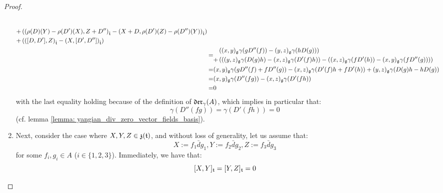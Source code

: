 \begin{proof}
\begin{enumerate}
$$\begin{aligned}
\begin{aligned}
                                    \\
                                    + & \left( \left(\rho(D)(Y) - \rho(D')(X), Z + D'' \right)_{\hat{\mathfrak{t}}} - \left( X + D, \rho(D')(Z) - \rho(D'')(Y) \right)_{\hat{\mathfrak{t}}} \right)
                                    \\
                                    + & \left( \left( [D, D'], Z \right)_{\hat{\mathfrak{t}}} - \left(X, [D', D'']\right)_{\hat{\mathfrak{t}}} \right)
                                \end{aligned}
                                \\
                                = & 
                                \begin{aligned}
                                    & \left( (x, y)_{\mathfrak{g}} \gamma( g D''(f) ) - (y, z)_{\mathfrak{g}} \gamma( h D(g) ) \right)
                                    \\
                                    + & \left( \left( (y, z)_{\mathfrak{g}} \gamma( D(g) h ) - (x, z)_{\mathfrak{g}} \gamma( D'(f) h ) \right) - \left( (x, z)_{\mathfrak{g}} \gamma( f D'(h) ) - (x, y)_{\mathfrak{g}} \gamma( f D''(g) ) \right) \right)
                                \end{aligned}
                                \\
                                = & (x, y)_{\mathfrak{g}} \gamma( g D''(f) + f D''(g) ) - (x, z)_{\mathfrak{g}} \gamma( D'(f) h + f D'(h) ) + (y, z)_{\mathfrak{g}} \gamma( D(g) h - h D(g) )
                                \\
                                = & (x, y)_{\mathfrak{g}} \gamma( D''(fg) ) - (x, z)_{\mathfrak{g}} \gamma( D'(fh) )
                                \\
                                = & 0
                            \end{aligned}
                        $$
                    with the last equality holding because of the definition of $\mathfrak{der}_{\gamma}(A)$, which implies in particular that:
                        $$\gamma( D''(fg) ) = \gamma( D'(fh) ) = 0$$
                    (cf. lemma \ref{lemma: yangian_div_zero_vector_fields_basis}).
                    \item Next, consider the case where $X, Y, Z \in \mathfrak{z}(\mathfrak{t})$, and without loss of generality, let us assume that:
                        $$X := f_1\bar{d}g_1, Y := f_2\bar{d}g_2, Z := f_3\bar{d}g_3$$
                    for some $f_i, g_i \in A$ ($i \in \{1, 2, 3\}$). Immediately, we have that:
                        $$[X, Y]_{\mathfrak{t}} = [Y, Z]_{\mathfrak{t}} = 0$$

\end{enumerate}
\end{proof}

